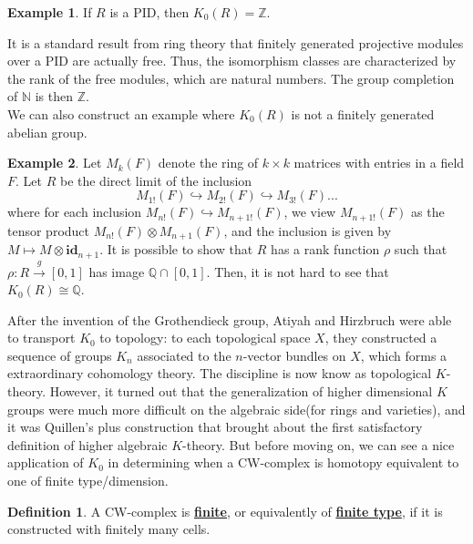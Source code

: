 \documentclass{article}
\theoremstyle{definition}
\theoremstyle{definition}
\newtheorem{definition}{Definition}[theorem]
\theoremstyle{definition}
\theoremstyle{definition}
\theoremstyle{definition}
\theoremstyle{definition}
\theoremstyle{definition}
\newtheorem{example}{Example}[theorem]
\begin{document}
\begin{tcolorbox}[colback=yellow!5!white,colframe=yellow!30!white]
\begin{example}
    If $R$ is a PID, then $K_0(R)=\mathbb{Z}$.
\end{example}
\end{tcolorbox}
It is a standard result from ring theory that finitely generated projective modules over a PID are actually free. Thus, the isomorphism classes are characterized by the rank of the free modules, which are natural numbers. The group completion of $\mathbb{N}$ is then $\mathbb{Z}$. \\


We can also construct an example where $K_0(R)$ is not a finitely generated abelian group. 

\begin{tcolorbox}[colback=yellow!5!white,colframe=yellow!30!white]
\begin{example}
    Let $M_k(F)$ denote the ring of $k\times k$ matrices with entries in a field $F$. Let $R$ be the direct limit of the inclusion 
    \[
    M_{1!}(F)\hookrightarrow M_{2!}(F)\hookrightarrow M_{3!}(F)...
    \]
    where for each inclusion $M_{n!}(F)\hookrightarrow M_{n+1!}(F)$, we view $M_{n+1!}(F)$ as the tensor product $M_{n!}(F)\otimes M_{n+1}(F)$, and the inclusion is given by $M\mapsto M\otimes \textbf{id}_{n+1}$. 
    It is possible to show that $R$ has a rank function $\rho$ such that $\rho: R\xrightarrow{g}[0,1]$ has image $\mathbb{Q}\cap [0,1]$. Then, it is not hard to see that $K_0(R)\cong \mathbb{Q}$.
\end{example}
\end{tcolorbox}


After the invention of the Grothendieck group, Atiyah and Hirzbruch were able to transport $K_0$ to topology: to each topological space $X$, they constructed a sequence of groups $K_n$ associated to the $n$-vector bundles on $X$, which forms a extraordinary cohomology theory. The discipline is now know as topological $K$-theory. However, it turned out that the generalization of higher dimensional $K$ groups were much more difficult on the algebraic side(for rings and varieties), and it was Quillen's plus construction that brought about the first satisfactory definition of higher algebraic $K$-theory. But before moving on, we can see a nice application of $K_0$ in determining when a CW-complex is homotopy equivalent to one of finite type/dimension.


\begin{tcolorbox}[colback=purple!5!white,colframe=purple!75!black]
\begin{definition}
A CW-complex is \underline{\textbf{finite}}, or equivalently of \underline{\textbf{finite type}}, if it is constructed with finitely many cells. 
\end{definition}
\end{tcolorbox}
\end{document}
